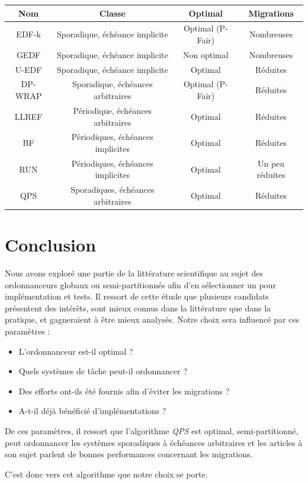 \documentclass[11pt,a4paper,oneside]{report}
\begin{document}
	\begin{tabular}{|c|c|c|c|}
		\hline
		\textbf{Nom} & \textbf{Classe} &  \textbf{Optimal} & \textbf{Migrations}\\
		\hline
		\hline
		EDF-k & Sporadique, échéance implicite & Optimal (P-Fair) & Nombreuses \\
		\hline
		GEDF & Sporadique, échéance implicite & Non optimal & Nombreuses \\
		\hline    
		U-EDF & Sporadique, échéance implicite  & Optimal & Réduites\\
		\hline
		DP-WRAP & Sporadique, échéances arbitraires & Optimal (P-Fair)& Réduites\\
		\hline
		LLREF & Périodique, échéances arbitraires & Optimal & Réduites \\
		\hline
		BF & Périodiques, échéances implicites & Optimal & Réduites \\
		\hline
		RUN & Périodiques, échéances implicites & Optimal & Un peu réduites\\
		\hline
		QPS & Sporadiques, échéances arbitraires & Optimal & Réduites\\
		\hline
		
	\end{tabular}
	\bigskip
	
	\section{Conclusion}
	Nous avons exploré une partie de la littérature scientifique au sujet des ordonnanceurs 
	globaux ou semi-partitionnés afin d'en sélectionner un pour implémentation et tests. 
	Il ressort de cette étude que plusieurs candidats présentent des intérêts, sont mieux 
	connus dans la littérature que dans la pratique, et gagneraient à être mieux analysés. 
	Notre choix sera influencé par ces paramètres : \medskip
	\begin{itemize}
		\item L'ordonnanceur est-il optimal ?
		\item Quels systèmes de tâche peut-il ordonnancer ?
		\item Des efforts ont-ils été fournis afin d'éviter les migrations ?
		\item A-t-il déjà bénéficié d'implémentations ?
	\end{itemize}
	De ces paramètres, il ressort que l'algorithme \textit{QPS} est optimal, semi-partitionné, 
	peut ordonnancer les systèmes sporadiques à échéances arbitraires et 
	les articles à son sujet parlent de bonnes performances concernant les migrations.
	
	
	C'est donc vers cet algorithme que notre choix se porte.
	
	
	
	
	
\end{document}
